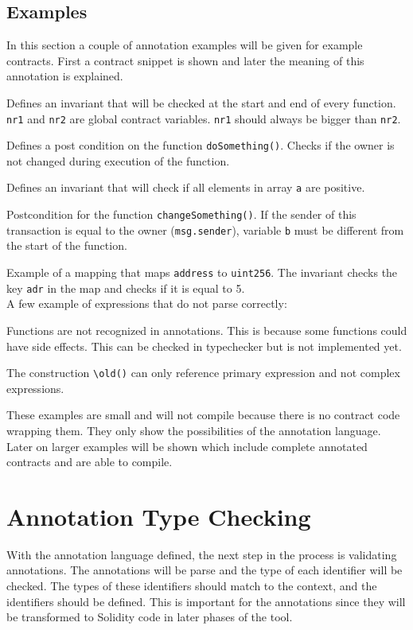 \documentclass[a4paper]{article}
\begin{document}
\subsection{Examples}
In this section a couple of annotation examples will be given for example contracts. First a contract snippet is shown and later the meaning of this annotation is explained.

Defines an invariant that will be checked at the start and end of every function. \texttt{nr1} and \texttt{nr2} are global contract variables. \texttt{nr1} should always be bigger than \texttt{nr2}.

Defines a post condition on the function \texttt{doSomething()}. Checks if the owner is not changed during execution of the function.

Defines an invariant that will check if all elements in array \texttt{a} are positive.

Postcondition for the function \texttt{changeSomething()}. If the sender of this transaction is equal to the owner (\texttt{msg.sender}), variable \texttt{b} must be different from the start of the function. 

Example of a mapping that maps \texttt{address} to \texttt{uint256}. The invariant checks the key \texttt{adr} in the map and checks if it is equal to 5. \hfill\\
A few example of expressions that do not parse correctly:

Functions are not recognized in annotations. This is because some functions could have side effects. This can be checked in typechecker but is not implemented yet.

The construction \texttt{\textbackslash old()} can only reference primary expression and not complex expressions.\medskip

These examples are small and will not compile because there is no contract code wrapping them. They only show the possibilities of the annotation language. Later on larger examples will be shown which include complete annotated contracts and are able to compile.

\newpage
\section{Annotation Type Checking}
\label{sec:typechecker}
With the annotation language defined, the next step in the process is validating annotations. The annotations will be parse and the type of each identifier will be checked. The types of these identifiers should match to the context, and the identifiers should be defined. This is important for the annotations since they will be transformed to Solidity code in later phases of the tool.
\end{document}
